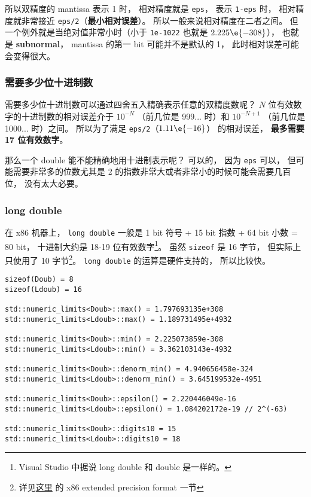 所以双精度的 mantissa 表示 1 时， 相对精度就是 \verb|eps|， 表示 \verb|1-eps| 时， 相对精度就非常接近 \verb|eps/2|（\textbf{最小相对误差}）。 所以一般来说相对精度在二者之间。 但一个例外就是当绝对值非常小时（小于 \verb|1e-1022| 也就是 $2.225\e{-308}$）， 也就是 \textbf{subnormal}， mantissa 的第一 bit 可能并不是默认的 1， 此时相对误差可能会变得很大。

\subsubsection{需要多少位十进制数}
需要多少位十进制数可以通过四舍五入精确表示任意的双精度数呢？ $N$ 位有效数字的十进制数的相对误差介于 $10^{-N}$ （前几位是 999... 时）和 $10^{-N+1}$ （前几位是 1000... 时）之间。 所以为了满足 \verb|eps/2|（$1.11\e{-16}$） 的相对误差， \textbf{最多需要 17 位有效数字}。

那么一个 double 能不能精确地用十进制表示呢？ 可以的， 因为 \verb|eps| 可以， 但可能需要非常多的位数尤其是 2 的指数非常大或者非常小的时候可能会需要几百位， 没有太大必要。

\subsubsection{long double}
在 x86 机器上， \verb|long double| 一般是 1 bit 符号 + 15 bit 指数 + 64 bit 小数 = 80 bit， 十进制大约是 18-19 位有效数字\footnote{Visual Studio 中据说 long double 和 double 是一样的。}。 虽然 \verb|sizeof| 是 16 字节， 但实际上只使用了 10 字节\footnote{详见\href{https://en.wikipedia.org/wiki/Extended_precision}{这里} 的 x86 extended precision format 一节}。 \verb|long double| 的运算是硬件支持的， 所以比较快。

\begin{lstlisting}[language=none]
sizeof(Doub) = 8
sizeof(Ldoub) = 16

std::numeric_limits<Doub>::max() = 1.797693135e+308
std::numeric_limits<Ldoub>::max() = 1.189731495e+4932

std::numeric_limits<Doub>::min() = 2.225073859e-308
std::numeric_limits<Ldoub>::min() = 3.362103143e-4932

std::numeric_limits<Doub>::denorm_min() = 4.940656458e-324
std::numeric_limits<Ldoub>::denorm_min() = 3.645199532e-4951

std::numeric_limits<Doub>::epsilon() = 2.220446049e-16
std::numeric_limits<Ldoub>::epsilon() = 1.084202172e-19 // 2^(-63)

std::numeric_limits<Doub>::digits10 = 15
std::numeric_limits<Ldoub>::digits10 = 18
\end{lstlisting}

